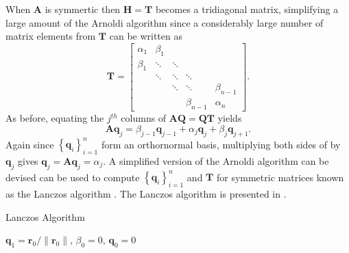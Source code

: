 When $\bm{A}$ is symmertic then $\bm{H} = \bm{T}$ becomes a tridiagonal matrix, simplifying a large amount of the Arnoldi algorithm since a considerably large number of matrix elements from $\bm{T}$ can be written as
\[
    \bm{T} =
    \begin{bmatrix}
        \alpha_1 & \beta_1 &        &             &             \\
        \beta_1  & \ddots  & \ddots &             &             \\
                 & \ddots  & \ddots & \ddots      &             \\
                 &         & \ddots & \ddots      & \beta_{n-1} \\
                 &         &        & \beta_{n-1} & \alpha_{n}
    \end{bmatrix}.
\]
As before, equating the $j^{th}$ columns of $\bm{A} \bm{Q} = \bm{Q} \bm{T}$ yields
\begin{equation}\label{eq: lancz_orth_basis}
    \bm{A} \bm{q}_{j} = \beta_{j-1} \bm{q}_{j-1} + \alpha_{j} \bm{q}_j + \beta_j \bm{q}_{j+1}.
\end{equation}
Again since $\left\{ \bm{q}_{i} \right\}_{i=1}^{n}$ form an orthornormal basis, multiplying both sides of  by $\bm{q}_j$ gives $\bm{q}_j = \bm{A} \bm{q}_j = \alpha_j$. A simplified version of the Arnoldi algorithm can be devised can be used to compute $\left\{ \bm{q}_{i} \right\}_{i=1}^{n}$ and $\bm{T}$ for symmetric matrices known as the Lanczos algorithm \cite{DemmelJamesW1997Anla}. The Lanczos algorithm is presented in .

{\centering
\begin{minipage}{.85\linewidth}
    \begin{algorithm}[H]
        \caption{Lanczos Algorithm}
        \label{alg: Lanczos_Algorithm}
        \SetAlgoLined
        \DontPrintSemicolon

        \BlankLine
        $\bm{q}_1 = \bm{r}_0 / \| \bm{r}_0 \|$, $\beta_0 = 0$, $\bm{q}_0 = 0$\;
        \BlankLine
    \end{algorithm}
\end{minipage}
\par
}